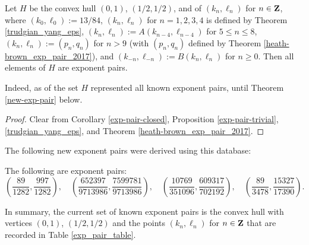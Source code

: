 \begin{corollary}\label{H-pairs}\cite[Theorem 1.3]{trudgian-yang}  Let $H$ be the convex hull $(0,1)$, $(1/2,1/2)$, and of $(k_n,\ell_n)$ for $n \in \mathbf{Z}$, where $(k_0,\ell_0) := 13/84$, $(k_n,\ell_n)$ for $n=1,2,3,4$ is defined by Theorem \ref{trudgian_yang_eps}, $(k_n,\ell_n) := A(k_{n-4},\ell_{n-4})$ for $5 \leq n \leq 8$, $(k_n,\ell_n) := (p_n,q_n)$ for $n > 9$ (with $(p_n,q_n)$ defined by Theorem \ref{heath-brown_exp_pair_2017}), and $(k_{-n},\ell_{-n}) := B(k_n,\ell_n)$ for $n \geq 0$.  Then all elements of $H$ are exponent pairs.
\end{corollary}

Indeed, as of \cite{trudgian-yang} the set $H$ represented all known exponent pairs, until Theorem \ref{new-exp-pair} below.

\begin{proof} Clear from Corollary \ref{exp-pair-closed}, Proposition \ref{exp-pair-trivial}, \ref{trudgian_yang_eps}, and Theorem \ref{heath-brown_exp_pair_2017}.
\end{proof}

The following new exponent pairs were derived using this database:

\begin{theorem}\label{new-exp-pair} The following are exponent pairs:
\[
\left(\frac{89}{1282}, \frac{997}{1282}\right),\quad \left(\frac{652397}{9713986}, \frac{7599781}{9713986}\right),\quad \left(\frac{10769}{351096}, \frac{609317}{702192}\right),\quad \left(\frac{89}{3478}, \frac{15327}{17390}\right).
\]
\end{theorem}
\derived
{}

In summary, the current set of known exponent pairs is the convex hull with vertices $(0, 1)$, $(1/2, 1/2)$ and the points $(k_n, \ell_n)$ for $n \in \mathbf{Z}$ that are recorded in Table \ref{exp_pair_table}. 

